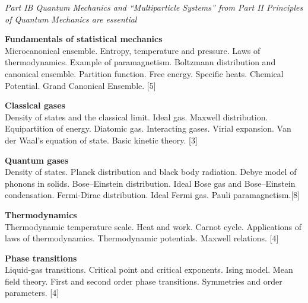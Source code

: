 \documentclass[a4paper]{article}
\begin{document}
\maketitle
{\small
  \noindent\emph{Part IB Quantum Mechanics and ``Multiparticle Systems'' from Part II Principles of Quantum Mechanics are essential}

  \vspace{10pt}
  \noindent\textbf{Fundamentals of statistical mechanics}\\
  Microcanonical ensemble. Entropy, temperature and pressure. Laws of thermodynamics. Example of paramagnetism. Boltzmann distribution and canonical ensemble. Partition function. Free energy. Specific heats. Chemical Potential. Grand Canonical Ensemble.\hspace*{\fill} [5]

  \vspace{10pt}
  \noindent\textbf{Classical gases}\\
  Density of states and the classical limit. Ideal gas. Maxwell distribution. Equipartition of energy. Diatomic gas. Interacting gases. Virial expansion. Van der Waal's equation of state. Basic kinetic theory.\hspace*{\fill} [3]

  \vspace{10pt}
  \noindent\textbf{Quantum gases}\\
  Density of states. Planck distribution and black body radiation. Debye model of phonons in solids. Bose--Einstein distribution. Ideal Bose gas and Bose--Einstein condensation. Fermi-Dirac distribution. Ideal Fermi gas. Pauli paramagnetism.\hspace*{\fill}[8]

  \vspace{10pt}
  \noindent\textbf{Thermodynamics}\\
  Thermodynamic temperature scale. Heat and work. Carnot cycle. Applications of laws of thermodynamics. Thermodynamic potentials. Maxwell relations.\hspace*{\fill} [4]

  \vspace{10pt}
  \noindent\textbf{Phase transitions}\\
  Liquid-gas transitions. Critical point and critical exponents. Ising model. Mean field theory. First and second order phase transitions. Symmetries and order parameters.\hspace*{\fill} [4]%
}

\tableofcontents
\setcounter{section}{-1}
\end{document}

